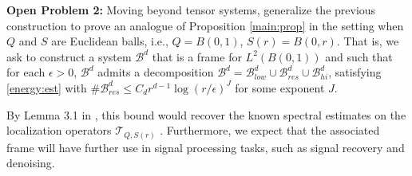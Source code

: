 \documentclass[conference]{IEEEtran}
\numberwithin{equation}{section}
\newcommand{\cB}{\mathcal B}
\begin{document}
{\bf Open Problem 2:} 
Moving beyond tensor systems, generalize the previous construction to prove an analogue of Proposition \ref{main:prop} in the setting when $Q$ and $S$ are Euclidean balls, i.e., $Q=B(0,1)$, $S(r) = B(0,r)$. That is, we ask to construct a system $\mathcal{B}^d$ that is a frame for $L^2(B(0,1))$ and such that for each $\epsilon > 0$, $\cB^d$ admits a decomposition  $\cB^d = \cB^d_{low} \cup \cB^d_{res} \cup \cB^d_{hi}$, satisfying \eqref{energy:est} with $\# \cB^d_{res} \leq C_d  r^{d-1} \log(r/\epsilon)^{J}$ for some exponent $J$.

By Lemma 3.1 in \cite{marceca2023}, this bound would recover the known spectral estimates on the localization operators $\mathcal{T}_{Q,S(r)}$ \cite{marceca2023,hughes2024eigenvalue}. Furthermore, we expect that the associated frame will have further use in signal processing tasks, such as signal recovery and denoising.


\printbibliography
\end{document}
